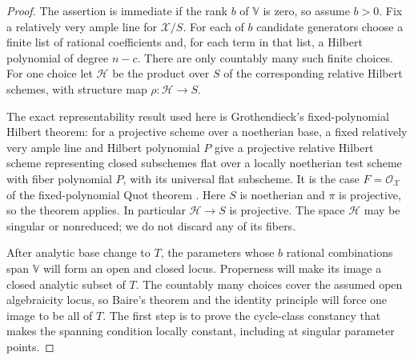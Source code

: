 \documentclass[11pt]{article}
\numberwithin{equation}{section}
\begin{document}
\begin{proof}
The assertion is immediate if the rank \(b\) of \(\mathbb V\) is
zero, so assume \(b>0\).  Fix a relatively very ample line for
\(\mathcal X/S\).  For each of \(b\) candidate generators choose
a finite list of rational coefficients and, for each term in
that list, a Hilbert polynomial of degree \(n-c\).  There are
only countably many such finite choices.  For one choice let
\(\mathscr H\) be the product over \(S\) of the corresponding
relative Hilbert schemes, with structure map
\(\rho:\mathscr H\to S\).

The exact representability result used here is Grothendieck's
fixed-polynomial Hilbert theorem: for a projective scheme over a
noetherian base, a fixed relatively very ample line and Hilbert
polynomial \(P\) give a projective relative Hilbert scheme
representing closed subschemes flat over a locally noetherian test
scheme with fiber polynomial \(P\), with its universal flat subscheme.
It is the case \(F=\mathcal O_{\mathcal X}\) of the fixed-polynomial
Quot theorem
\cite[Section~3, Theorem~3.2, pp.~259--260, and the Hilbert
specialization on p.~265]{P3SWGrothendieckHilbert1961}.
Here \(S\) is noetherian and \(\pi\) is projective, so the theorem
applies.  In particular \(\mathscr H\to S\) is projective.
The space \(\mathscr H\) may be singular or nonreduced; we do not
discard any of its fibers.

After analytic base change to \(T\), the parameters whose \(b\)
rational combinations span \(\mathbb V\) will form an open and
closed locus.  Properness will make its image a closed analytic
subset of \(T\).  The countably many choices cover the assumed
open algebraicity locus, so Baire's theorem and the identity
principle will force one image to be all of \(T\).  The first
step is to prove the cycle-class constancy that makes the spanning
condition locally constant, including at singular parameter points.


\end{proof}
\end{document}

